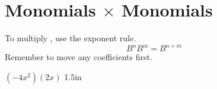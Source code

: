 \section{Monomials $\times$ Monomials}

\begin{tcolorbox}[center,width=6in]
    To multiply   ,
    use the   exponent rule.
    {
        \Large
        \[
            B^n B^m = B^{n+m}
        \]
    }
    Remember to move any coefficients   first.
\end{tcolorbox}


    {
        $ (-4x^2)(2x) $
    }
    {1.5in}



